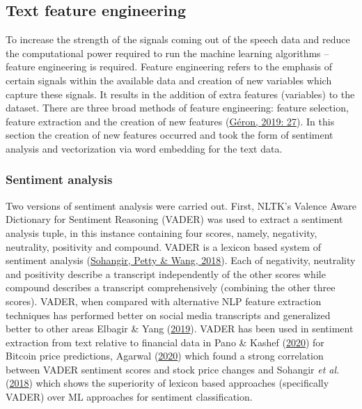 \documentclass[11pt,preprint, authoryear]{elsarticle}
\numberwithin{equation}{section}
\numberwithin{figure}{section}
\numberwithin{table}{section}
\begin{document}
\hypertarget{text-feature-engineering}{%
\subsection{Text feature engineering}\label{text-feature-engineering}}

To increase the strength of the signals coming out of the speech data
and reduce the computational power required to run the machine learning
algorithms -- feature engineering is required. Feature engineering
refers to the emphasis of certain signals within the available data and
creation of new variables which capture these signals. It results in the
addition of extra features (variables) to the dataset. There are three
broad methods of feature engineering: feature selection, feature
extraction and the creation of new features
(\protect\hyperlink{ref-geron2019hands}{Géron, 2019: 27}). In this
section the creation of new features occurred and took the form of
sentiment analysis and vectorization via word embedding for the text
data.

\hypertarget{sentiment-analysis}{%
\subsubsection{Sentiment analysis}\label{sentiment-analysis}}

Two versions of sentiment analysis were carried out. First, NLTK's
Valence Aware Dictionary for Sentiment Reasoning (VADER) was used to
extract a sentiment analysis tuple, in this instance containing four
scores, namely, negativity, neutrality, positivity and compound. VADER
is a lexicon based system of sentiment analysis
(\protect\hyperlink{ref-sohangir2018financial}{Sohangir, Petty \& Wang,
2018}). Each of negativity, neutrality and positivity describe a
transcript independently of the other scores while compound describes a
transcript comprehensively (combining the other three scores). VADER,
when compared with alternative NLP feature extraction techniques has
performed better on social media transcripts and generalized better to
other areas Elbagir \& Yang
(\protect\hyperlink{ref-elbagir2019twitter}{2019}). VADER has been used
in sentiment extraction from text relative to financial data in Pano \&
Kashef (\protect\hyperlink{ref-pano2020complete}{2020}) for Bitcoin
price predictions, Agarwal
(\protect\hyperlink{ref-agarwal2020sentiment}{2020}) which found a
strong correlation between VADER sentiment scores and stock price
changes and Sohangir \emph{et al.}
(\protect\hyperlink{ref-sohangir2018financial}{2018}) which shows the
superiority of lexicon based approaches (specifically VADER) over ML
approaches for sentiment classification.
\end{document}

